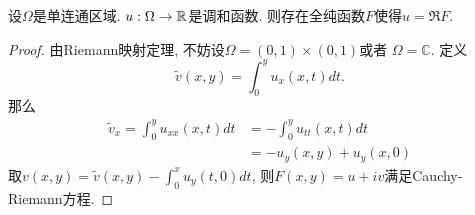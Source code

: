 \begin{proposition}
    设$\Omega$是单连通区域. $u: \Omega \to \mathbb{R}$是调和函数. 则存在全纯函数$F$使得$u=\Re F$.
\end{proposition}
\begin{proof}
    由Riemann映射定理, 不妨设$\Omega = (0,1)\times (0,1)$或者 $\Omega= \mathbb{C}$.  定义
    \begin{equation}
        \tilde{v}(x,y)= \int^y_0 u_x(x,t)dt. 
    \end{equation}
    那么
    \begin{equation}
        \begin{split}
            \tilde{v}_x  =\int^y_0 u_{xx}(x,t)dt &=- \int^y_0 u_{tt}(x,t)dt \\
            &= -u_y(x,y)+u_y(x,0)
        \end{split}
    \end{equation}
    取$v(x,y)=\tilde{v}(x,y)- \int^x_0 u_y(t,0)dt$, 则$F(x,y)=u+iv$满足Cauchy-Riemann方程.
\end{proof}
